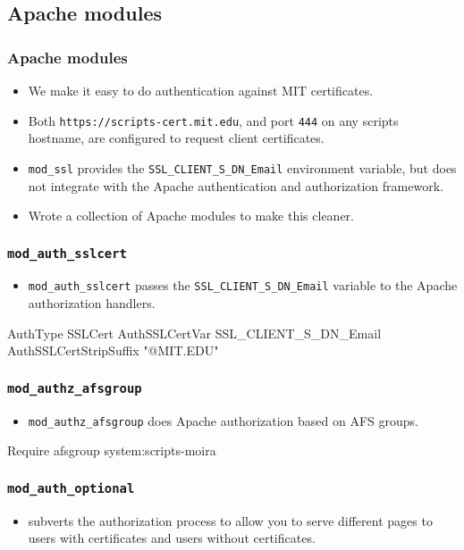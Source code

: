 \subsection{Apache modules}

\begin{frame}[fragile]
  \frametitle{Apache modules}
  \begin{itemize}
  \item We make it easy to do authentication against MIT certificates.
  \item Both \texttt{https://scripts-cert.mit.edu}, and port
    \texttt{444} on any scripts hostname, are configured to request
    client certificates.
  \item \texttt{mod\_ssl} provides the
    \texttt{SSL\_CLIENT\_S\_DN\_Email} environment variable, but does
    not integrate with the Apache authentication and authorization
    framework.
  \item Wrote a collection of Apache modules to make this cleaner.
  \end{itemize}
\end{frame}

\begin{frame}[fragile]
  \frametitle{\texttt{mod\_auth\_sslcert}}
  \begin{itemize}
  \item \texttt{mod\_auth\_sslcert} passes the
    \texttt{SSL\_CLIENT\_S\_DN\_Email} variable to the Apache
    authorization handlers.
  \end{itemize}
\begin{semiverbatim}
AuthType SSLCert
AuthSSLCertVar SSL_CLIENT_S_DN_Email
AuthSSLCertStripSuffix "@MIT.EDU"
\end{semiverbatim}
\end{frame}

\begin{frame}[fragile]
  \frametitle{\texttt{mod\_authz\_afsgroup}}
  \begin{itemize}
  \item \texttt{mod\_authz\_afsgroup} does Apache authorization based
    on AFS groups.
  \end{itemize}
\begin{semiverbatim}
Require afsgroup system:scripts-moira
\end{semiverbatim}
\end{frame}

\begin{frame}[fragile]
  \frametitle{\texttt{mod\_auth\_optional}}
  \begin{itemize}
  \item {} subverts the authorization process
    to allow you to serve different pages to users with certificates
    and users without certificates.
  \end{itemize}
\end{frame}

